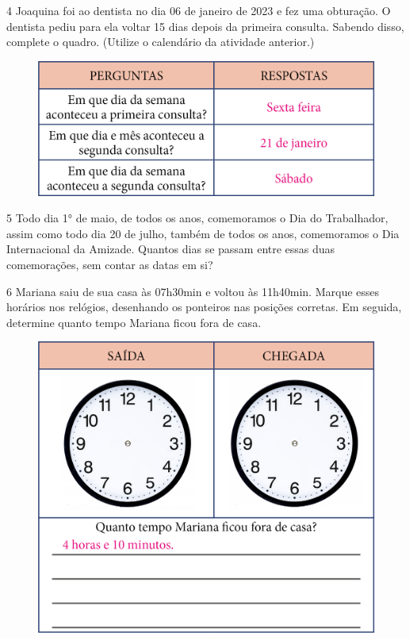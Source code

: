 \num{4} Joaquina foi ao dentista no dia 06 de janeiro de 2023 e fez uma
obturação. O dentista pediu para ela voltar 15 dias depois da primeira
consulta. Sabendo disso, complete o quadro. (Utilize o calendário
da atividade anterior.)

\begin{figure}[htpb!]
\includegraphics[width=\textwidth]{./media/image53.png}
\end{figure}

\pagebreak
\num{5} Todo dia 1° de maio, de todos os anos, comemoramos o Dia do Trabalhador,
assim como todo dia 20 de julho, também de todos os anos, comemoramos o
Dia Internacional da Amizade. Quantos dias se passam entre essas duas
comemorações, sem contar as datas em si?


\num{6} Mariana saiu de sua casa às 07h30min e voltou às 11h40min. Marque esses
horários nos relógios, desenhando os ponteiros nas posições
corretas. Em seguida, determine quanto tempo Mariana ficou fora de casa.


\begin{figure}[htpb!]
\centering
\includegraphics[width=.65\textwidth]{./media/image54.png}
\end{figure}

